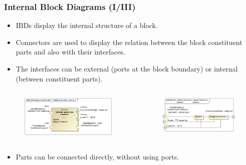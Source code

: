 \documentclass[xcolor=dvipsnames,t]{beamer}
\begin{document}
\begin{frame}
\frametitle {Internal Block Diagrams (I/III)}
\begin{itemize}
\item IBDs display the internal structure of a block.
\item Connectors are used to display the relation between the block constituent parts and  also with their interfaces.
\item The interfaces can be external (ports at the block boundary) or internal (between constituent parts).
\end{itemize}



\begin{columns}
\begin{column}{0.5\textwidth}
\begin{figure}
 	\includegraphics[width=\textwidth]{BDDVSCamera.jpg}
\end{figure}
\end{column}
\begin{column}{0.5\textwidth}
\begin{figure}
 	\includegraphics[width=\textwidth]{IBDVisibleSCamera.jpg}
\end{figure}
\end{column}


\end{columns}

\begin{itemize}
\item Parts can be connected directly, without using ports.
\end{itemize}
\end{frame}
\end{document}
